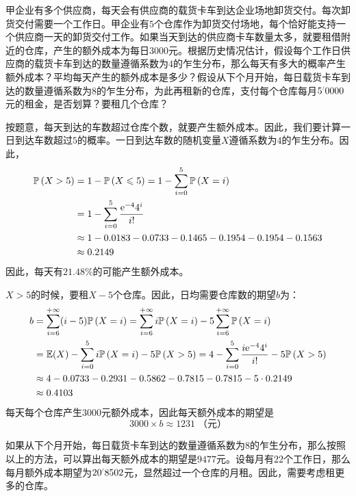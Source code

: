 \documentclass[12pt,UTF8]{ctexbook}
\begin{document}
\begin{et}
    甲企业有多个供应商，每天会有供应商的载货卡车到达企业场地卸货交付。每次卸货交付需要一个工作日。甲企业有$5$个仓库作为卸货交付场地，每个恰好能支持一个供应商一天的卸货交付工作。如果当天到达的供应商卡车数量太多，就要租借附近的仓库，产生的额外成本为每日$3000$元。根据历史情况估计，假设每个工作日供应商的载货卡车到达的数量遵循系数为$4$的乍生分布，那么每天有多大的概率产生额外成本？平均每天产生的额外成本是多少？假设从下个月开始，每日载货卡车到达的数量遵循系数为$8$的乍生分布，为此再租新的仓库，支付每个仓库每月$5\dlim{0000}$元的租金，是否划算？要租几个仓库？
\end{et}

\begin{so}
    按题意，每天到达的车数超过仓库个数，就要产生额外成本。因此，我们要计算一日到达车数超过$5$的概率。一日到达车数的随机变量$X$遵循系数为$4$的乍生分布。因此，
    \begin{align*}
        \mathbb{P}\left(X>5\right) &= 1 - \mathbb{P}\left(X \leqslant 5\right)= 1 - \sum_{i=0}^5 \mathbb{P}\left(X = i\right) \\
        &= 1 - \sum_{i=0}^{5} \frac{\mathrm{e}^{-4}4^i}{i!} \\
        &\approx 1 - 0.0183 - 0.0733 - 0.1465 - 0.1954 - 0.1954 - 0.1563 \\
        &\approx 0.2149
    \end{align*}
    因此，每天有$21.48\%$的可能产生额外成本。

    $X>5$的时候，要租$X-5$个仓库。因此，日均需要仓库数的期望$b$为：
    \begin{align*}
        b&= \sum_{i=6}^{+\infty} (i - 5)\mathbb{P}\left(X = i\right) = \sum_{i=6}^{+\infty} i\mathbb{P}\left(X = i\right) - 5 \sum_{i=6}^{+\infty} \mathbb{P}\left(X = i\right) \\
        &= \mathbb{E}(X) - \sum_{i=0}^{5} i\mathbb{P}\left(X = i\right) - 5 \mathbb{P}\left(X>5\right) = 4 - \sum_{i=0}^{5} \frac{i\mathrm{e}^{-4}4^i}{i!} - 5 \mathbb{P}\left(X>5\right) \\
        &\approx 4 - 0.0733 - 0.2931 - 0.5862 - 0.7815 - 0.7815 - 5\cdot 0.2149 \\
        &\approx 0.4103 
    \end{align*}
    每天每个仓库产生$3000$元额外成本，因此每天额外成本的期望是
    $$3000 \times b \approx 1231\; \mbox{（元）}$$

    如果从下个月开始，每日载货卡车到达的数量遵循系数为$8$的乍生分布，那么按照以上的方法，可以算出每天额外成本的期望是$9477$元。设每月有$22$个工作日，那么每月额外成本期望为$20\dlim{8502}$元，显然超过一个仓库的月租。因此，需要考虑租更多的仓库。


\end{so}
\end{document}
